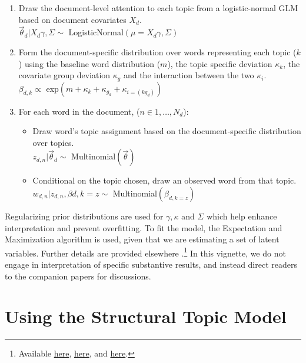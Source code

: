 \documentclass[nojss]{jss}
\begin{document}
\begin{enumerate}
\item Draw the document-level attention to each topic from a logistic-normal GLM based on document covariates $X_d$. \\
$\vec{\theta}_d | X_d\gamma, \Sigma \sim$ LogisticNormal$(\mu = X_d\gamma, \Sigma)$
\item Form the document-specific distribution over words representing each topic ($k$) using the baseline word distribution ($m$), the topic specific deviation $\kappa_k$, the covariate group deviation $\kappa_g$ and the interaction between the two $\kappa_i$.\\
$\beta_{d,k} \propto $ exp$(m + \kappa_{k} + \kappa_{g_d} + \kappa_{i=(kg_d)})$
\item For each word in the document, ($n \in 1, \dots, N_d$):
\begin{itemize}
\item Draw word's topic assignment based on the document-specific distribution over topics.\\
 $z_{d,n} | \vec{\theta}_d \sim $ Multinomial$(\vec{\theta})$
\item Conditional on the topic chosen, draw an observed word from that topic.\\
$ w_{d,n} | z_{d,n}, \beta{d,k=z} \sim $ Multinomial$(\beta_{d,k=z})$
\end{itemize}
\end{enumerate}

Regularizing prior distributions are used for $\gamma, \kappa$ and $\Sigma$ which help enhance interpretation and prevent overfitting. To fit the model, the Expectation and Maximization algorithm is used, given that we are estimating a set of latent variables. Further details are provided elsewhere \citep{nips2013,STMEdo,ajps,TextComparative}.\footnote{Available \href{http://scholar.harvard.edu/files/dtingley/files/topicmodelsopenendedexperiments.pdf}{here}, \href{http://scholar.harvard.edu/files/bstewart/files/stmnips2013.pdf}{here}, and \href{http://scholar.harvard.edu/files/dtingley/files/comparativepoliticstext.pdf}{here}.} In this vignette, we do not engage in interpretation of specific substantive results, and instead direct readers to the companion papers for discussions.


\section{Using the Structural Topic Model}
\end{document}
